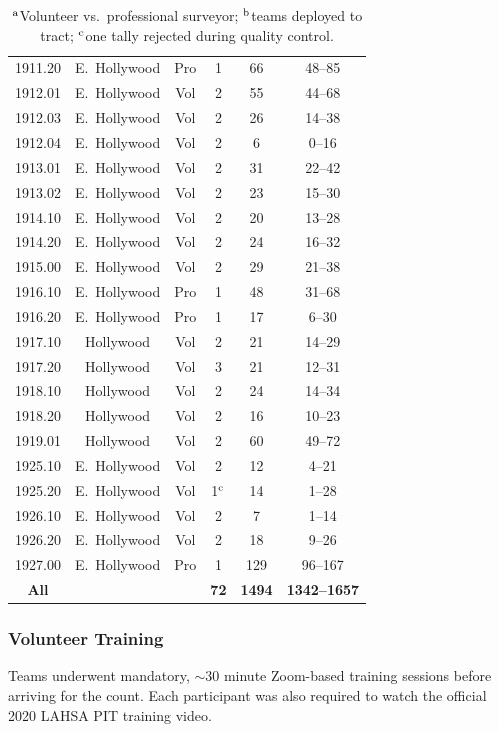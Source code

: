 \documentclass[11pt,twocolumn]{article}
\def\Count{count}
\begin{document}
\begin{table}[t!]
{\begin{tabular}{cccccc}
1911.20 & E.~Hollywood & Pro & 1 & 66 & 48--85 \\
1912.01 & E.~Hollywood & Vol & 2 & 55 & 44--68 \\
1912.03 & E.~Hollywood & Vol & 2 & 26 & 14--38 \\
1912.04 & E.~Hollywood & Vol & 2 & 6 & 0--16 \\
1913.01 & E.~Hollywood & Vol & 2 & 31 & 22--42 \\
1913.02 & E.~Hollywood & Vol & 2 & 23 & 15--30 \\
1914.10 & E.~Hollywood & Vol & 2 & 20 & 13--28 \\
1914.20 & E.~Hollywood & Vol & 2 & 24 & 16--32 \\
1915.00 & E.~Hollywood & Vol & 2 & 29 & 21--38 \\
1916.10 & E.~Hollywood & Pro & 1 & 48 & 31--68 \\
1916.20 & E.~Hollywood & Pro & 1 & 17 & 6--30 \\
1917.10 & Hollywood & Vol & 2 & 21 & 14--29 \\
1917.20 & Hollywood & Vol & 3 & 21 & 12--31 \\
1918.10 & Hollywood & Vol & 2 & 24 & 14--34 \\
1918.20 & Hollywood & Vol & 2 & 16 & 10--23 \\
1919.01 & Hollywood & Vol & 2 & 60 & 49--72 \\
1925.10 & E.~Hollywood & Vol & 2 & 12 & 4--21 \\
1925.20 & E.~Hollywood & Vol & 1$^{\rm c}$ & 14 & 1--28 \\
1926.10 & E.~Hollywood & Vol & 2 & 7 & 1--14 \\
1926.20 & E.~Hollywood & Vol & 2 & 18 & 9--26 \\
1927.00 & E.~Hollywood & Pro & 1 & 129 & 96--167\\
\cmidrule{1-6}
{\bf All} & & & {\bf 72} & {\bf 1494} & {\bf 1342--1657}
\\ \bottomrule
\end{tabular}
}
\caption*{$^{\rm a}$Volunteer vs.~professional surveyor; $^{\rm b}$teams deployed to 
		tract; $^{\rm c}$one tally rejected during quality control.}
\label{tbl:tractStats}
\end{table}

\subsubsection{Volunteer Training}
\label{sec:training}

Teams underwent mandatory, $\sim$30 minute Zoom-based training sessions before arriving 
for the \Count. Each participant was also required to watch the official 2020 LAHSA PIT training 
video.%
\end{document}
